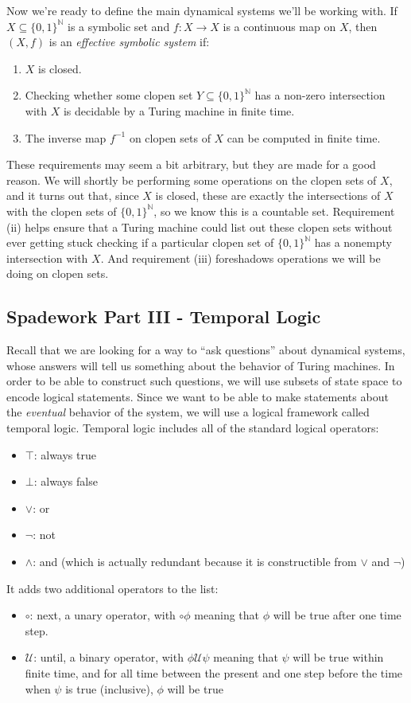 \documentclass{fkpaper}
\newcommand{\lnext}{\circ}
\newcommand{\ltil}{\mathcal{U}}
\renewcommand{\Nn}{\mathbb{N}}
\begin{document}
\begin{multicols}{2}
Now we're ready to define the main dynamical systems we'll be working with. If $X \subseteq \{0,1\}^\Nn$ is a symbolic set and $f: X \to X$ is a continuous map on $X$, then $(X, f)$ is an {\it effective symbolic system} if:
\begin{enumerate}[label=(\roman*)]
  \item $X$ is closed.
  \item Checking whether some clopen set $Y \subseteq \{0,1\}^\Nn$ has a non-zero intersection with $X$ is decidable by a Turing machine in finite time.
  \item The inverse map $f^{-1}$ on clopen sets of $X$ can be computed in finite time.
\end{enumerate}

These requirements may seem a bit arbitrary, but they are made for a good reason. We will shortly be performing some operations on the clopen sets of $X$, and it turns out that, since $X$ is closed, these are exactly the intersections of $X$ with the clopen sets of $\{0,1\}^\Nn$, so we know this is a countable set. Requirement (ii) helps ensure that a Turing machine could list out these clopen sets without ever getting stuck checking if a particular clopen set of $\{0,1\}^\Nn$ has a nonempty intersection with $X$. And requirement (iii) foreshadows operations we will be doing on clopen sets.

\subsection{Spadework Part III - Temporal Logic}

Recall that we are looking for a way to ``ask questions'' about dynamical systems, whose answers will tell us something about the behavior of Turing machines. In order to be able to construct such questions, we will use subsets of state space to encode logical statements. Since we want to be able to make statements about the {\it eventual} behavior of the system, we will use a logical framework called temporal logic. Temporal logic includes all of the standard logical operators:
\begin{itemize}
  \item $\top$: always true
  \item $\bot$: always false
  \item $\lor$: or
  \item $\lnot$: not
  \item $\land$: and (which is actually redundant because it is constructible from $\lor$ and $\lnot$)
\end{itemize}
It adds two additional operators to the list:
\begin{itemize}
  \item $\lnext$: next, a unary operator, with $\lnext \phi$ meaning that $\phi$ will be true after one time step.
  \item $\ltil$: until, a binary operator, with $\phi \ltil \psi$ meaning that $\psi$ will be true within finite time, and for all time between the present and one step before the time when $\psi$ is true (inclusive), $\phi$ will be true
\end{itemize}


\end{multicols}
\end{document}

